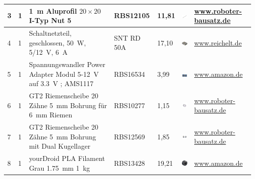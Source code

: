 \begin{center}
\begin{tabularx}{\linewidth}{|p{0.4cm}|p{0.4cm}|X|X|p{1cm}|X|X|}
		3 & 1 & 1\ m Aluprofil $20 \times 20$ I-Typ Nut 5 & RBS12105 & 11,81  & \includegraphics[width=2cm]{Images/Material/aluprofil.jpg} & \href{https://www.roboter-bausatz.de/p/1-meter-aluprofil-20x20-i-typ-nut-5}{www.roboter-bausatz.de} \\ 
		\hline
		4 & 1 & Schaltnetzteil, geschlossen, 50\ W, 5/12\ V, 6\ A & SNT RD 50A
		& 17,10   & \includegraphics[width=2cm]{Images/Material/RD50.png} & \href{https://www.reichelt.de/sg/de/schaltnetzteil-geschlossen-50-w-5-12-v-6-a-snt-rd-50a-p137098.html}{www.reichelt.de} \\ 
		\hline
		5 & 1 & Spannungswandler Power Adapter Modul 5-12\ V auf 3.3\ V ; AMS1117
		& RBS16534 & 3,99   & \includegraphics[width=2cm]{Images/Material/ams1117.jpg} & \href{https://www.amazon.de/AZDelivery-AMS1117-Stromversorgungsmodul-Arduino-Raspberry/dp/B072FTMS89}{www.amazon.de} \\ 
		\hline
		6 & 1 & GT2 Riemenscheibe 20 Zähne 5\ mm Bohrung für 6\ mm Riemen & RBS10277 & 1,15  & \includegraphics[width=2cm]{Images/Material/RBS10277.jpg} & \href{https://www.roboter-bausatz.de/p/gt2-riemenscheibe-20-zaehne-5mm-bohrung-fuer-6mm-riemen}{www.roboter-bausatz.de} \\ 
		\hline
		7 & 1 & GT2 Riemenscheibe 20 Zähne 5\ mm Bohrung mit Dual Kugellager & RBS12569 & 1,85   & \includegraphics[width=2cm]{Images/Material/RBS12569.jpg} &	\href{https://www.roboter-bausatz.de/p/gt2-riemenscheibe-20-zaehne-5mm-bohrung-mit-dual-kugellager}{www.roboter-bausatz.de} \\ 
		\hline
		8 & 1 & yourDroid PLA Filament Grau 1.75\ mm 1\ kg  & RBS13428 & 19,21   & \includegraphics[width=2cm]{Images/Material/PLA.jpg} & \href{https://www.amazon.de/AmazonBasics-3D-Drucker-Filament-PLA-Kunststoff-leuchtend-1-kg-Spule/dp/B07T6WHW2L}{www.amazon.de} \\ 
		\hline		
					\end{tabularx}
		

\end{center}

